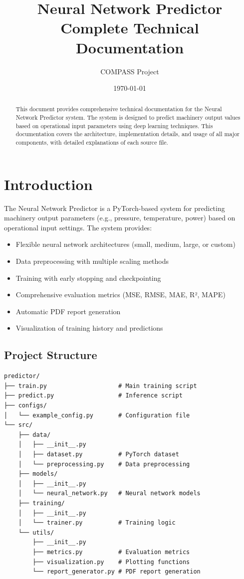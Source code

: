 \documentclass[11pt,a4paper]{article}
\title{\textbf{Neural Network Predictor} \\ Complete Technical Documentation}
\author{COMPASS Project}
\date{\today}
\begin{document}
\maketitle

\begin{abstract}
This document provides comprehensive technical documentation for the Neural Network Predictor system. The system is designed to predict machinery output values based on operational input parameters using deep learning techniques. This documentation covers the architecture, implementation details, and usage of all major components, with detailed explanations of each source file.
\end{abstract}

\tableofcontents
\newpage

\section{Introduction}

The Neural Network Predictor is a PyTorch-based system for predicting machinery output parameters (e.g., pressure, temperature, power) based on operational input settings. The system provides:

\begin{itemize}
    \item Flexible neural network architectures (small, medium, large, or custom)
    \item Data preprocessing with multiple scaling methods
    \item Training with early stopping and checkpointing
    \item Comprehensive evaluation metrics (MSE, RMSE, MAE, R², MAPE)
    \item Automatic PDF report generation
    \item Visualization of training history and predictions
\end{itemize}

\subsection{Project Structure}

\begin{verbatim}
predictor/
├── train.py                    # Main training script
├── predict.py                  # Inference script
├── configs/
│   └── example_config.py       # Configuration file
└── src/
    ├── data/
    │   ├── __init__.py
    │   ├── dataset.py          # PyTorch dataset
    │   └── preprocessing.py    # Data preprocessing
    ├── models/
    │   ├── __init__.py
    │   └── neural_network.py   # Neural network models
    ├── training/
    │   ├── __init__.py
    │   └── trainer.py          # Training logic
    └── utils/
        ├── __init__.py
        ├── metrics.py          # Evaluation metrics
        ├── visualization.py    # Plotting functions
        └── report_generator.py # PDF report generation
\end{verbatim}
\end{document}
